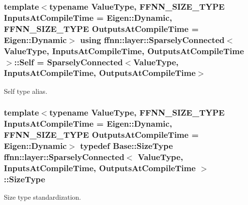 \hypertarget{classffnn_1_1layer_1_1_sparsely_connected_ad27c96a5f26e2f44fb25bebd9a838666}{
\subsubsection[{Self}]{\setlength{\rightskip}{0pt plus 5cm}template$<$typename Value\-Type, F\-F\-N\-N\-\_\-\-S\-I\-Z\-E\-\_\-\-T\-Y\-P\-E Inputs\-At\-Compile\-Time = Eigen\-::\-Dynamic, F\-F\-N\-N\-\_\-\-S\-I\-Z\-E\-\_\-\-T\-Y\-P\-E Outputs\-At\-Compile\-Time = Eigen\-::\-Dynamic$>$ using {\bf ffnn\-::layer\-::\-Sparsely\-Connected}$<$ Value\-Type, Inputs\-At\-Compile\-Time, Outputs\-At\-Compile\-Time $>$\-::{\bf Self} =  {\bf Sparsely\-Connected}$<$Value\-Type, Inputs\-At\-Compile\-Time, Outputs\-At\-Compile\-Time$>$}}\label{classffnn_1_1layer_1_1_sparsely_connected_ad27c96a5f26e2f44fb25bebd9a838666}


Self type alias. 

\hypertarget{classffnn_1_1layer_1_1_sparsely_connected_a86b75c2723c1f8b6771224257f5eb1c1}{
\subsubsection[{Size\-Type}]{\setlength{\rightskip}{0pt plus 5cm}template$<$typename Value\-Type, F\-F\-N\-N\-\_\-\-S\-I\-Z\-E\-\_\-\-T\-Y\-P\-E Inputs\-At\-Compile\-Time = Eigen\-::\-Dynamic, F\-F\-N\-N\-\_\-\-S\-I\-Z\-E\-\_\-\-T\-Y\-P\-E Outputs\-At\-Compile\-Time = Eigen\-::\-Dynamic$>$ typedef {\bf Base\-::\-Size\-Type} {\bf ffnn\-::layer\-::\-Sparsely\-Connected}$<$ Value\-Type, Inputs\-At\-Compile\-Time, Outputs\-At\-Compile\-Time $>$\-::{\bf Size\-Type}}}\label{classffnn_1_1layer_1_1_sparsely_connected_a86b75c2723c1f8b6771224257f5eb1c1}


Size type standardization. 


